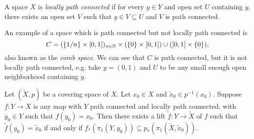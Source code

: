 \begin{definition}
  A space $X$ is \emph{locally path connected} if for
  every $y \in Y$ and open set $U$ containing $y$, there
  exists an open set $V$ such that $y \in V \subseteq U$
  and $V$ is path connected.
\end{definition}

\begin{example}
  An example of a space which is path connected but
  not locally path connected is
  \[
    C = (\{1 / n\} \times [0, 1])_{n \in \mathbb{N}} \times (\{0\} \times [0, 1]) \cup ([0, 1] \times \{0\}),
  \]
  also known as the \emph{comb space}. We can see
  that $C$ is path connected, but it is not locally path
  connected, e.g. take $y = (0, 1)$ and $U$ to be
  any small enough open neighborhood containing $y$.
\end{example}

\begin{theorem}\label{thm:theorem-23}
  Let $(\widetilde{X}, p)$ be a covering space of $X$. Let
  $x_0 \in X$ and $\widetilde{x}_0 \in p^{-1}(x_0)$. Suppose
  $f : Y \to X$ is any map with $Y$ path connected
  and locally path connected, with $y_0 \in Y$ such that
  $f(y_0) = x_0$. Then there exists a lift
  $\widetilde{f} : Y \to \widetilde{X}$ of $f$ such that
  $\widetilde{f}(y_0) = \widetilde{x}_0$ if and only if
  $f_*(\pi_1(Y, y_0)) \subseteq p_*(\pi_1(\widetilde{X}, \widetilde{x}_0))$.
\end{theorem}

